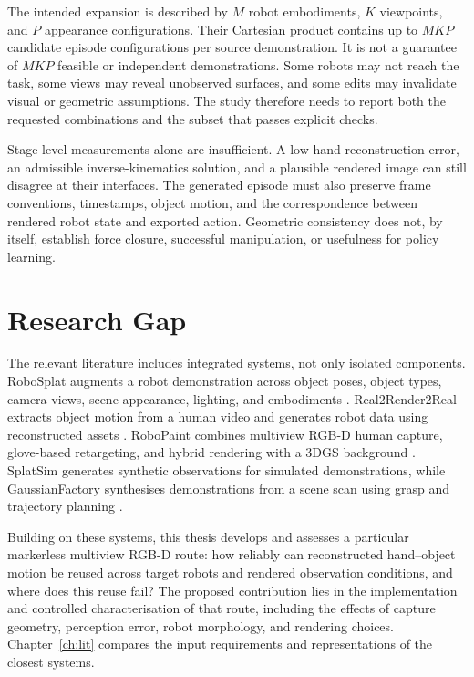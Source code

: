 The intended expansion is described by $M$ robot embodiments, $K$ viewpoints,
and $P$ appearance configurations. Their Cartesian product contains up to
$M K P$ candidate episode configurations per source demonstration. It is not
a guarantee of $M K P$ feasible or independent demonstrations. Some robots may
not reach the task, some views may reveal unobserved surfaces, and some edits
may invalidate visual or geometric assumptions. The study therefore needs to
report both the requested combinations and the subset that passes explicit
checks.

Stage-level measurements alone are insufficient. A low hand-reconstruction
error, an admissible inverse-kinematics solution, and a plausible rendered
image can still disagree at their interfaces. The generated episode must also
preserve frame conventions, timestamps, object motion, and the correspondence
between rendered robot state and exported action. Geometric consistency does
not, by itself, establish force closure, successful manipulation, or usefulness
for policy learning.

\section{Research Gap}
\label{sec:gap}

The relevant literature includes integrated systems, not only isolated
components. RoboSplat augments a robot demonstration across object poses,
object types, camera views, scene appearance, lighting, and embodiments
\cite{robosplat}. Real2Render2Real extracts object motion from a human video
and generates robot data using reconstructed assets \cite{real2render2real}.
RoboPaint combines multiview RGB-D human capture, glove-based retargeting, and
hybrid rendering with a 3DGS background \cite{robopaint}. SplatSim generates
synthetic observations for simulated demonstrations, while GaussianFactory
synthesises demonstrations from a scene scan using grasp and trajectory
planning \cite{splatsim, gaussianfactory}.

Building on these systems, this thesis develops and assesses a particular
markerless multiview RGB-D route:
how reliably can reconstructed hand--object motion be reused across target
robots and rendered observation conditions, and where does this reuse fail?
The proposed contribution lies in the implementation and controlled
characterisation of that route, including the effects of capture geometry,
perception error, robot morphology, and rendering choices. Chapter~\ref{ch:lit}
compares the input requirements and representations of the closest systems.

